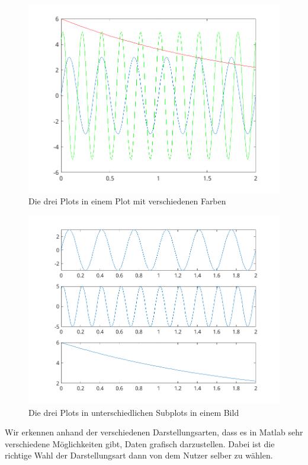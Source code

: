 \documentclass{article}
\begin{document}
\begin{figure}[!h]
  \centering
  \includegraphics[width=\textwidth]{../assets/images/ET2P6/triplePlot.png}
  \caption{Die drei Plots in einem Plot mit verschiedenen Farben}
  \label{fig:auf3bco}
\end{figure}

\begin{figure}[!h]
  \centering
  \includegraphics[width=\textwidth]{../assets/images/ET2P6/subplot.png}
  \caption{Die drei Plots in unterschiedlichen Subplots in einem Bild}
  \label{fig:auf3bsub}
\end{figure}


Wir erkennen anhand der verschiedenen Darstellungsarten, dass es in Matlab sehr verschiedene Möglichkeiten gibt, Daten grafisch darzustellen. Dabei ist die richtige Wahl der Darstellungsart dann von dem Nutzer selber zu wählen.
\end{document}
